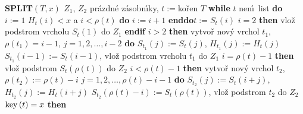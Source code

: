 {\bf SPLIT$\left(T,x\right)$\newline 
$Z_1$}, $Z_2$ pr\'azdn\'e z\'asobn\'\i ky, $t:=$ko\v ren $T$\newline 
{\bf while} $t$ nen\'\i\ list {\bf do}\newline
\phantom{---}$i:=1$\newline 
\phantom{---}{\bf while} $H_t\left(i\right)<x$ a $i<\rho \left(t\right)$ {\bf do} $i:=i+1$ {\bf enddo}\newline \phantom{---}$t:=S_t\left(i\right)$\newline 
\phantom{---}{\bf if} $i=2$ {\bf then} vlo\v z podstrom vrcholu $S_t\left(1\right)$ do $Z_1$ 
{\bf endif}\newline 
\phantom{---}{\bf if} $i>2$ {\bf then}\newline 
\phantom{------}vytvo\v r nov\'y vrchol $t_1$, $\rho \left(t_1\right)=i-1$,\newline 
\phantom{------}{\bf for every} $j=1,2,\dots,i-2$ {\bf do}\newline 
\phantom{---------}$S_{t_1}\left(j\right):=S_t\left(j\right)$, $H_{t_1}\left(j\right):=H_t\left(j\right)$\newline 
\phantom{------}{\bf enddo}\newline 
\phantom{------}$S_{t_1}\left(i-1\right):=S_t\left(i-1\right)$, vlo\v z podstrom vrcholu $t_1$ do $Z_1$\newline 
\phantom{---}{\bf endif}\newline 
\phantom{---}{\bf if} $i=\rho \left(t\right)-1$ {\bf then}\newline 
\phantom{------}vlo\v z podstrom $S_t\left(\rho \left(t\right)\right)$ do $Z_2$ 
\phantom{---}{\bf endif}\newline 
\phantom{---}{\bf if} $i<\rho \left(t\right)-1$ {\bf then}\newline 
\phantom{------}vytvo\v r nov\'y vrchol $t_2$, $\rho \left(t_2\right):=\rho \left(t\right)-i$\newline 
\phantom{------}{\bf for every} $j=1,2,\dots,\rho \left(t\right)-i-1$ {\bf do}\newline 
\phantom{---------}$S_{t_2}\left(j\right):=S_t\left(i+j\right)$, $H_{t_2}\left(j\right):=H_t\left(i+j\right)$\newline 
\phantom{------}{\bf enddo}\newline 
\phantom{------}$S_{t_2}\left(\rho \left(t\right)-i\right):=S_t\left(\rho \left(t\right)\right)$, vlo\v z podstrom $t_2$ do $Z_2$ \newline 
\phantom{---}{\bf endif\newline 
enddo\newline 
if} $\operatorname{key}\left(t\right)=x$ {\bf then}\newline 
